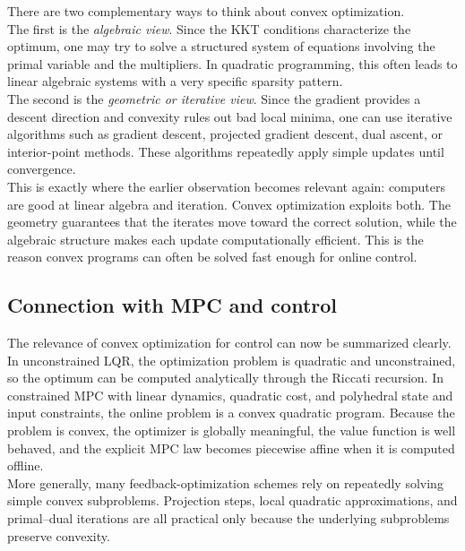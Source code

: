 There are two complementary ways to think about convex optimization.\\
The first is the \emph{algebraic view}. Since the KKT conditions characterize the optimum, one may try to solve a structured system of equations involving the primal variable and the multipliers. In quadratic programming, this often leads to linear algebraic systems with a very specific sparsity pattern.\\
The second is the \emph{geometric or iterative view}. Since the gradient provides a descent direction and convexity rules out bad local minima, one can use iterative algorithms such as gradient descent, projected gradient descent, dual ascent, or interior-point methods. These algorithms repeatedly apply simple updates until convergence.\\

This is exactly where the earlier observation becomes relevant again: computers are good at linear algebra and iteration. Convex optimization exploits both. The geometry guarantees that the iterates move toward the correct solution, while the algebraic structure makes each update computationally efficient. This is the reason convex programs can often be solved fast enough for online control.

\subsection{Connection with MPC and control}

The relevance of convex optimization for control can now be summarized clearly.\\
In unconstrained LQR, the optimization problem is quadratic and unconstrained, so the optimum can be computed analytically through the Riccati recursion. In constrained MPC with linear dynamics, quadratic cost, and polyhedral state and input constraints, the online problem is a convex quadratic program. Because the problem is convex, the optimizer is globally meaningful, the value function is well behaved, and the explicit MPC law becomes piecewise affine when it is computed offline.\\
More generally, many feedback-optimization schemes rely on repeatedly solving simple convex subproblems. Projection steps, local quadratic approximations, and primal--dual iterations are all practical only because the underlying subproblems preserve convexity.